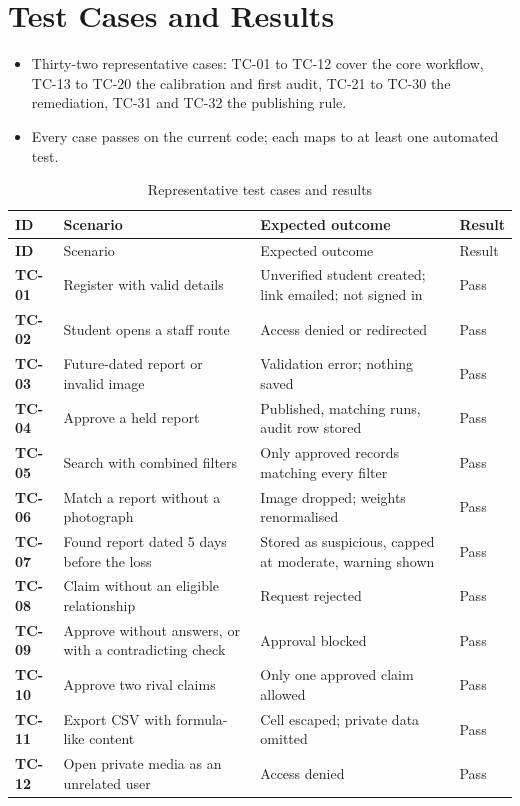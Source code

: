 \documentclass[12pt,a4paper,oneside]{report}
\begin{document}
\section{Test Cases and Results}
\begin{itemize}
  \item Thirty-two representative cases: TC-01 to TC-12 cover the core workflow, TC-13 to TC-20 the calibration and first audit, TC-21 to TC-30 the remediation, TC-31 and TC-32 the publishing rule.
  \item Every case passes on the current code; each maps to at least one automated test.
\end{itemize}
\begin{longtable}{>{\bfseries}P{14mm}P{56mm}P{60mm}P{12mm}}
\caption{Representative test cases and results}\\
\toprule
ID & Scenario & Expected outcome & Result\\
\midrule
\endfirsthead
\toprule
ID & Scenario & Expected outcome & Result\\
\midrule
\endhead
TC-01 & Register with valid details & Unverified student created; link emailed; not signed in & Pass\\
TC-02 & Student opens a staff route & Access denied or redirected & Pass\\
TC-03 & Future-dated report or invalid image & Validation error; nothing saved & Pass\\
TC-04 & Approve a held report & Published, matching runs, audit row stored & Pass\\
TC-05 & Search with combined filters & Only approved records matching every filter & Pass\\
TC-06 & Match a report without a photograph & Image dropped; weights renormalised & Pass\\
TC-07 & Found report dated 5 days before the loss & Stored as suspicious, capped at moderate, warning shown & Pass\\
TC-08 & Claim without an eligible relationship & Request rejected & Pass\\
TC-09 & Approve without answers, or with a contradicting check & Approval blocked & Pass\\
TC-10 & Approve two rival claims & Only one approved claim allowed & Pass\\
TC-11 & Export CSV with formula-like content & Cell escaped; private data omitted & Pass\\
TC-12 & Open private media as an unrelated user & Access denied & Pass\\

\end{longtable}
\end{document}
